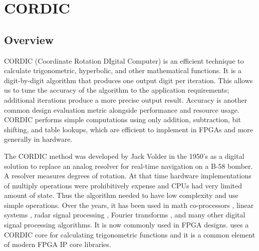 
\chapter{CORDIC}
\glsresetall
\label{chapter:cordic}

\section{Overview}
\label{subsec:CORDIC_Overview}


CORDIC (Coordinate Rotation DIgital Computer) is an efficient technique to calculate trigonometric, hyperbolic, and other mathematical functions. It is a digit-by-digit algorithm that produces one output digit per iteration. This allows us to tune the accuracy of the algorithm to the application requirements; additional iterations produce a more precise output result. Accuracy is another common design evaluation metric alongside performance and resource usage. CORDIC performs simple computations using only addition, subtraction, bit shifting, and table lookups, which are efficient to implement in FPGAs and more generally in hardware. 

\begin{aside}
The CORDIC method was developed by Jack Volder in the 1950's as a digital solution to replace an analog resolver for real-time navigation on a B-58 bomber. A resolver measures degrees of rotation. At that time hardware implementations of multiply operations were prohibitively expense and CPUs had very limited amount of state. Thus the algorithm needed to have low complexity and use simple operations.  Over the years, it has been used in math co-processors \cite{duprat1993cordic}, linear systems \cite{ahmed1982highly}, radar signal processing \cite{andraka1996building}, Fourier transforms \cite{despain1974fourier}, and many other digital signal processing algorithms. It is now commonly used in FPGA designs. \VHLS uses a CORDIC core for calculating trigonometric functions and it is a common element of modern FPGA IP core libraries.
\end{aside}

